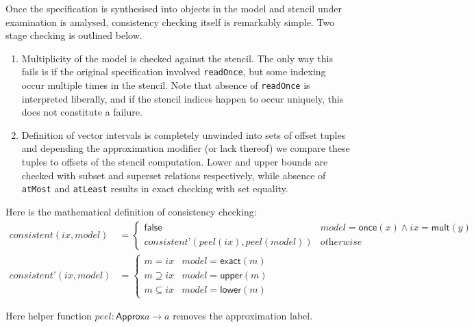 \documentclass[acmlarge,review]{acmart}
\theoremstyle{definition}
\theoremstyle{plain}
\theoremstyle{remark}
\begin{document}
Once the specification is synthesised into objects in the model and stencil
under examination is analysed, consistency checking itself is remarkably simple.
Two stage checking is outlined below.

\begin{enumerate}
  \item Multiplicity of the model is checked against the stencil. The only way
    this fails is if the original specification involved \texttt{readOnce}, but
    some indexing occur multiple times in the stencil.  Note that absence of
    \texttt{readOnce} is interpreted liberally, and if the stencil indices
    happen to occur uniquely, this does not constitute a failure.
  \item Definition of vector intervals is completely unwinded into sets of
    offset tuples and depending the approximation modifier (or lack thereof)
    we compare these tuples to offsets of the stencil computation. Lower and
    upper bounds are checked with subset and superset relations respectively,
    while absence of \texttt{atMost} and \texttt{atLeast} results in exact
    checking with set equality.
\end{enumerate}

Here is the mathematical definition of consistency checking:
\begin{align*}
  \textit{consistent}(\textit{ix}, \textit{model}) & = \begin{cases}
    \textsf{false} & \textit{model} = \textsf{once}(x) \wedge ix = \textsf{mult}(y) \\
    \textit{consistent'}(\textit{peel}(ix), \textit{peel}(model)) & \textit{otherwise}
  \end{cases} \\
%
  \textit{consistent'}(\textit{ix}, \textit{model}) & = \begin{cases}
    m = ix & \textit{model} = \textsf{exact}(m) \\
    m \supseteq ix & \textit{model} = \textsf{upper}(m) \\
    m \subseteq ix & \textit{model} = \textsf{lower}(m)
  \end{cases}
\end{align*}

Here helper function $\textit{peel} : \textsf{Approx} a \to a$ removes the
approximation label.

\end{document}
